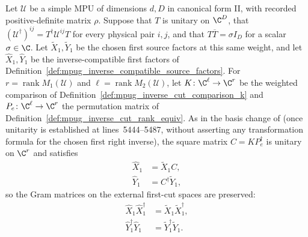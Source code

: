 \begin{lemma}
    \label{thm:mpug_inverse_source_unitary_transport}
    \leanok
    Let $\mathcal U$ be a simple MPU of dimensions $d,D$ in canonical
    form II, with recorded positive-definite matrix $\rho$. Suppose
    that $T$ is unitary on $\C^D$, that
    $(\mathcal U^\dagger)^{ij}=T^\dagger\mathcal U^{ij}T$ for every
    physical pair $i,j$, and that $T\overline T=\sigma I_D$ for a
    scalar $\sigma\in\C$. Let $\widetilde X_1,\widetilde Y_1$ be the
    chosen first source factors at this same weight, and let
    $\widehat X_1,\widehat Y_1$ be the inverse-compatible first factors
    of Definition~\ref{def:mpug_inverse_compatible_source_factors}.
    For $r=\operatorname{rank}M_1(\mathcal U)$ and
    $\ell=\operatorname{rank}M_2(\mathcal U)$, let $K\colon\C^\ell\to\C^r$ be
    the weighted comparison of Definition~\ref{def:mpug_inverse_cut_comparison_k}
    and $P_e\colon\C^\ell\to\C^r$ the permutation matrix of
    Definition~\ref{def:mpug_inverse_cut_rank_equiv}. As in the basis change of
    \cite[lines~5432--5443]{FrancoRubio2025MPUGauging} (once unitarity is
    established at lines~5444--5487, without asserting any transformation
    formula for the chosen first right inverse), the square matrix
    $C=KP_e^\dagger$ is unitary on $\C^r$ and satisfies
    \begin{align}
        \widehat X_1 & =\widetilde X_1C,         \\
        \widehat Y_1 & =C^\dagger\widetilde Y_1,
    \end{align}
    so the Gram matrices on the external first-cut spaces are preserved:
    \begin{align}
        \widehat X_1\widehat X_1^\dagger
         & =\widetilde X_1\widetilde X_1^\dagger, \\
        \widehat Y_1^\dagger\widehat Y_1
         & =\widetilde Y_1^\dagger\widetilde Y_1.
    \end{align}
\end{lemma}

